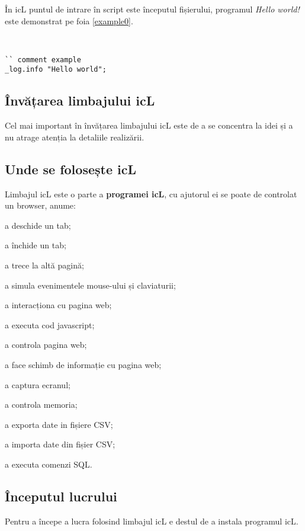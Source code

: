 În icL puntul de intrare în script este începutul fișierului, programul \textit{Hello world!} este demonstrat pe foia \ref{example0}.

\

\begin{lstlisting}[caption=Пример, label=example0]
`` comment example
_log.info "Hello world";
\end{lstlisting}

\subsection{Învățarea limbajului icL}

Cel mai important în învățarea limbajului icL este de a se concentra la idei și a nu atrage atenția la detaliile realizării.

\subsection{Unde se folosește icL}

Limbajul icL este o parte a \textbf{programei icL}, cu ajutorul ei se poate de controlat un browser, anume:
\begin{icItems}
\item
	a deschide un tab;
\item
	a închide un tab;
\item
	a trece la altă pagină;
\item
	a simula evenimentele mouse-ului și claviaturii;
\item
	a interacționa cu pagina web;
\item
	a executa cod javascript;
\item
	a controla pagina web;
\item
	a face schimb de informație cu pagina web;
\item
	a captura ecranul;
\item
	a controla memoria;
\item
	a exporta date in fișiere CSV;
\item
	a importa date din fișier CSV;
\item
	a executa comenzi SQL.
\end{icItems}

\subsection{Începutul lucrului}

Pentru a începe a lucra folosind limbajul icL e destul de a instala programul icL.
